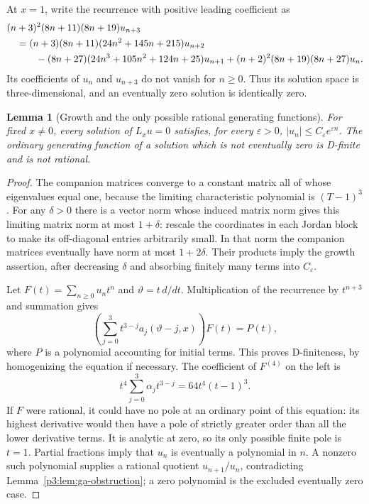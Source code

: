 \documentclass[11pt,a4paper]{article}
\newtheorem{lemma}[theorem]{Lemma}
\theoremstyle{definition}
\theoremstyle{remark}
\numberwithin{equation}{section}
\begin{document}
At $x=1$, write the recurrence with positive leading coefficient as
\begin{align}
 &(n+3)^2(8n+11)(8n+19)u_{n+3}\notag\\
 &\quad=(n+3)(8n+11)(24n^2+145n+215)u_{n+2}\notag\\
 &\qquad\quad-(8n+27)(24n^3+105n^2+124n+25)u_{n+1}
 +(n+2)^2(8n+19)(8n+27)u_n.
 \label{p3:eq:ga-base}
\end{align}
Its coefficients of $u_n$ and $u_{n+3}$ do not vanish for $n\ge0$.
Thus its solution space is three-dimensional, and an eventually zero
solution is identically zero.

\begin{lemma}[Growth and the only possible rational generating functions]
\label{p3:lem:ga-growth}
For fixed $x\ne0$, every solution of $L_xu=0$ satisfies, for every
$\varepsilon>0$, $|u_n|\le C_\varepsilon e^{\varepsilon n}$.
The ordinary generating function of a solution which is not
eventually zero is D-finite and is not rational.
\end{lemma}
\begin{proof}
The companion matrices converge to a constant matrix all of whose
eigenvalues equal one, because the limiting characteristic polynomial
is $(T-1)^3$. For any $\delta>0$ there is a vector norm whose induced
matrix norm gives this limiting matrix norm at most $1+\delta$:
rescale the coordinates in each Jordan block to make its off-diagonal
entries arbitrarily small. In that norm the companion matrices
eventually have norm at most $1+2\delta$. Their products imply the
growth assertion, after decreasing $\delta$ and absorbing finitely
many terms into $C_\varepsilon$.

Let $F(t)=\sum_{n\ge0}u_nt^n$ and $\vartheta=t\,d/dt$.
Multiplication of the recurrence by $t^{n+3}$ and summation gives
\begin{equation}\label{p3:eq:ga-generating}
 \left(\sum_{j=0}^3t^{3-j}a_j(\vartheta-j,x)\right)F(t)=P(t),
\end{equation}
where $P$ is a polynomial accounting for initial terms. This proves
D-finiteness, by homogenizing the equation if necessary. The
coefficient of $F^{(4)}$ on the left is
\[
 t^4\sum_{j=0}^3\alpha_j t^{3-j}=64t^4(t-1)^3.
\]
If $F$ were rational, it could have no pole at an ordinary point of
this equation: its highest derivative would then have a pole of
strictly greater order than all the lower derivative terms.
It is analytic at zero, so its only possible finite pole is $t=1$.
Partial fractions imply that $u_n$ is eventually a polynomial in $n$.
A nonzero such polynomial supplies a rational quotient $u_{n+1}/u_n$,
contradicting Lemma~\ref{p3:lem:ga-obstruction}; a zero polynomial is
the excluded eventually zero case.
\end{proof}
\end{document}
